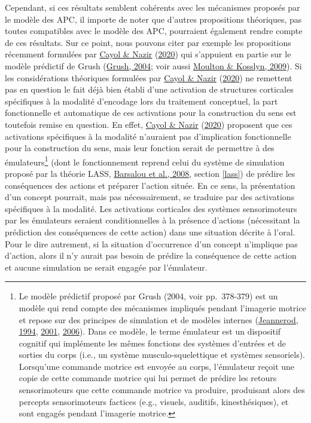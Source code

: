 \documentclass[
  a4paper,12pt,twoside,onecolumn,openright,final,oldfontcommands]{memoir}
\begin{document}
Cependant, si ces résultats semblent cohérents avec les mécanismes proposés par le modèle des APC, il importe de noter que d'autres propositions théoriques, pas toutes compatibles avec le modèle des APC, pourraient également rendre compte de ces résultats. Sur ce point, nous pouvons citer par exemple les propositions récemment formulées par \protect\hyperlink{ref-cayol_why_2020}{Cayol \& Nazir} (\protect\hyperlink{ref-cayol_why_2020}{2020}) qui s'appuient en partie sur le modèle prédictif de Grush (\protect\hyperlink{ref-grush_emulation_2004}{Grush, 2004}; voir aussi \protect\hyperlink{ref-moulton_imagining_2009}{Moulton \& Kosslyn, 2009}). Si les considérations théoriques formulées par \protect\hyperlink{ref-cayol_why_2020}{Cayol \& Nazir} (\protect\hyperlink{ref-cayol_why_2020}{2020}) ne remettent pas en question le fait déjà bien établi d'une activation de structures corticales spécifiques à la modalité d'encodage lors du traitement conceptuel, la part fonctionnelle et automatique de ces activations pour la construction du sens est toutefois remise en question. En effet, \protect\hyperlink{ref-cayol_why_2020}{Cayol \& Nazir} (\protect\hyperlink{ref-cayol_why_2020}{2020}) proposent que ces activations spécifiques à la modalité n'auraient pas d'implication fonctionnelle pour la construction du sens, mais leur fonction serait de permettre à des émulateurs\footnote{Le modèle prédictif proposé par Grush (2004, voir pp.~378-379) est un modèle qui rend compte des mécanismes impliqués pendant l'imagerie motrice et repose sur des principes de simulation et de modèles internes (\protect\hyperlink{ref-jeannerod_representing_1994}{Jeannerod, 1994}, \protect\hyperlink{ref-jeannerod_neural_2001}{2001}, \protect\hyperlink{ref-jeannerod_motor_2006}{2006}). Dans ce modèle, le terme émulateur est un dispositif cognitif qui implémente les mêmes fonctions des systèmes d'entrées et de sorties du corps (i.e., un système musculo-squelettique et systèmes sensoriels). Lorsqu'une commande motrice est envoyée au corps, l'émulateur reçoit une copie de cette commande motrice qui lui permet de prédire les retours sensorimoteurs que cette commande motrice va produire, produisant alors des percepts sensorimoteurs factices (e.g., visuels, auditifs, kinesthésiques), et sont engagés pendant l'imagerie motrice.} (dont le fonctionnement reprend celui du système de simulation proposé par la théorie LASS, \protect\hyperlink{ref-barsalou_language_2008}{Barsalou et al., 2008}, section \ref{lass}) de prédire les conséquences des actions et préparer l'action située. En ce sens, la présentation d'un concept pourrait, mais pas nécessairement, se traduire par des activations spécifiques à la modalité. Les activations corticales des systèmes sensorimoteurs par les émulateurs seraient conditionnelles à la présence d'actions (nécessitant la prédiction des conséquences de cette action) dans une situation décrite à l'oral. Pour le dire autrement, si la situation d'occurrence d'un concept n'implique pas d'action, alors il n'y aurait pas besoin de prédire la conséquence de cette action et aucune simulation ne serait engagée par l'émulateur.
\end{document}

